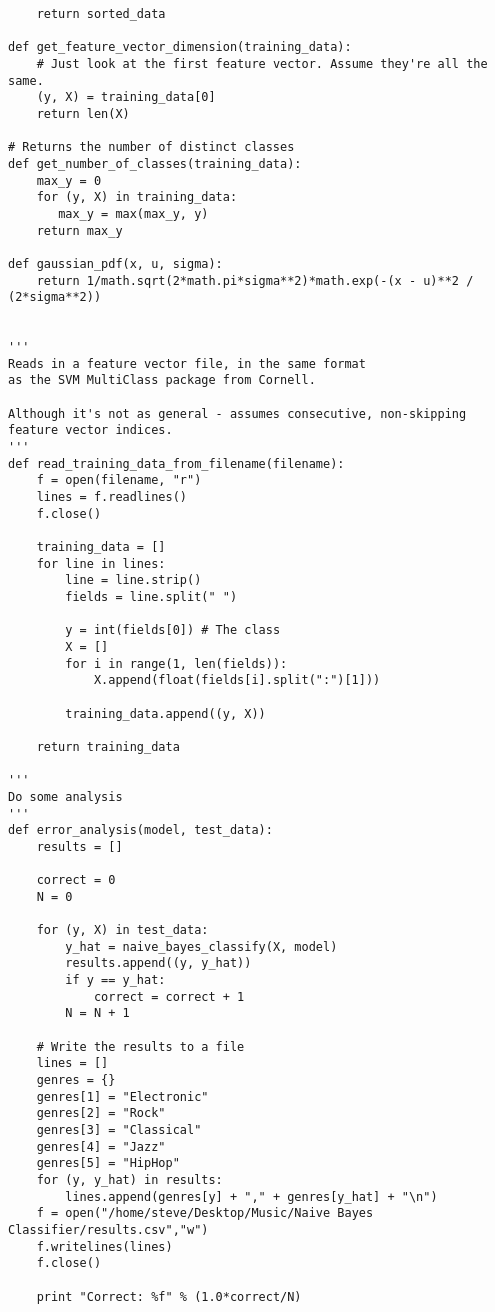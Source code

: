 \documentclass[aps,twocolumn,secnumarabic,balancelastpage,amsmath,amssymb,nofootinbib]{revtex4-1}
\begin{document}
\begin{widetext}
\begin{verbatim}
    return sorted_data

def get_feature_vector_dimension(training_data):
    # Just look at the first feature vector. Assume they're all the same.
    (y, X) = training_data[0]
    return len(X)

# Returns the number of distinct classes
def get_number_of_classes(training_data):
    max_y = 0
    for (y, X) in training_data:
       max_y = max(max_y, y)
    return max_y

def gaussian_pdf(x, u, sigma):
    return 1/math.sqrt(2*math.pi*sigma**2)*math.exp(-(x - u)**2 / (2*sigma**2))


'''
Reads in a feature vector file, in the same format
as the SVM MultiClass package from Cornell.

Although it's not as general - assumes consecutive, non-skipping
feature vector indices.
'''
def read_training_data_from_filename(filename):
    f = open(filename, "r")
    lines = f.readlines()
    f.close()

    training_data = []
    for line in lines:
        line = line.strip()
        fields = line.split(" ")

        y = int(fields[0]) # The class
        X = []
        for i in range(1, len(fields)):
            X.append(float(fields[i].split(":")[1]))

        training_data.append((y, X))

    return training_data

'''
Do some analysis
'''
def error_analysis(model, test_data):
    results = []

    correct = 0
    N = 0
    
    for (y, X) in test_data:
        y_hat = naive_bayes_classify(X, model)
        results.append((y, y_hat))
        if y == y_hat:
            correct = correct + 1
        N = N + 1

    # Write the results to a file
    lines = []
    genres = {}
    genres[1] = "Electronic"
    genres[2] = "Rock"
    genres[3] = "Classical"
    genres[4] = "Jazz"
    genres[5] = "HipHop"
    for (y, y_hat) in results:
        lines.append(genres[y] + "," + genres[y_hat] + "\n")
    f = open("/home/steve/Desktop/Music/Naive Bayes Classifier/results.csv","w")
    f.writelines(lines)
    f.close()

    print "Correct: %f" % (1.0*correct/N)

\end{verbatim}


\end{widetext}
\end{document}
